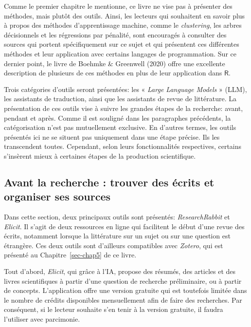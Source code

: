 \documentclass[
  letterpaper,
  DIV=11,
  numbers=noendperiod,
  oneside]{scrreprt}
\begin{document}
Comme le premier chapitre le mentionne, ce livre ne vise pas à présenter
des méthodes, mais plutôt des outils. Ainsi, les lecteurs qui souhaitent
en savoir plus à propos des méthodes d'apprentissage machine, comme le
\emph{clustering}, les arbres décisionnels et les régressions par
pénalité, sont encouragés à consulter des sources qui portent
spécifiquement sur ce sujet et qui présentent ces différentes méthodes
et leur application avec certains langages de programmation. Sur ce
dernier point, le livre de Boehmke \& Greenwell (2020) offre une
excellente description de plusieurs de ces méthodes en plus de leur
application dans \(\textsf{R}\).

Trois catégories d'outils seront présentées: les « \emph{Large Language
Models} » (LLM), les assistants de traduction, ainsi que les assistants
de revue de littérature. La présentation de ces outils vise à suivre les
grandes étapes de la recherche: avant, pendant et après. Comme il est
souligné dans les paragraphes précédents, la catégorisation n'est pas
mutuellement exclusive. En d'autres termes, les outils présentés ici ne
se situent pas uniquement dans une étape précise. Ils les transcendent
toutes. Cependant, selon leurs fonctionnalités respectives, certains
s'insèrent mieux à certaines étapes de la production scientifique.

\hypertarget{avant-la-recherche-trouver-des-uxe9crits-et-organiser-ses-sources}{%
\subsection{Avant la recherche : trouver des écrits et organiser ses
sources}\label{avant-la-recherche-trouver-des-uxe9crits-et-organiser-ses-sources}}

Dans cette section, deux principaux outils sont présentés:
\emph{ResearchRabbit} et \emph{Elicit}. Il s'agit de deux ressources en
ligne qui facilitent le début d'une revue des écrits, notamment lorsque
la littérature sur un sujet ou sur une question est étrangère. Ces deux
outils sont d'ailleurs compatibles avec \emph{Zotero}, qui est présenté
au Chapitre~\ref{sec-chap5} de ce livre.

Tout d'abord, \emph{Elicit}, qui grâce à l'IA, propose des résumés, des
articles et des livres scientifiques à partir d'une question de
recherche préliminaire, ou à partir de concepts. L'application offre une
version gratuite qui est toutefois limitée dans le nombre de crédits
disponibles mensuellement afin de faire des recherches. Par conséquent,
si le lecteur souhaite s'en tenir à la version gratuite, il faudra
l'utiliser avec parcimonie.
\end{document}
